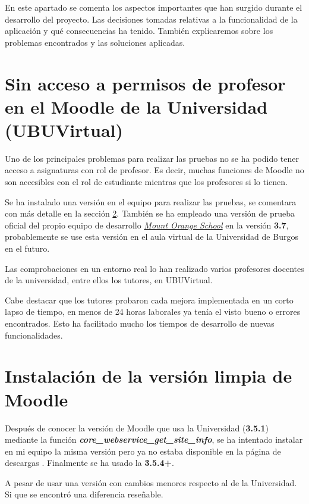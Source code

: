 
En este apartado se comenta los aspectos importantes que han surgido durante el desarrollo del proyecto. Las decisiones tomadas relativas a la funcionalidad de la aplicación y qué consecuencias ha tenido. También explicaremos sobre los problemas encontrados y las soluciones aplicadas.

\section{Sin acceso a permisos de profesor en el Moodle de la Universidad (UBUVirtual)}

Uno de los principales problemas para realizar las pruebas no se ha podido tener acceso a asignaturas con rol de profesor. Es decir, muchas funciones de Moodle no son accesibles con el rol de estudiante mientras que los profesores si lo tienen.


Se ha instalado una versión en el equipo para realizar las pruebas, se comentara con más detalle en la sección \ref{sec:instalacionMoodle}. También se ha empleado una versión de prueba oficial del propio equipo de desarrollo \href{https://school.demo.moodle.net}{\textit{Mount Orange School}} en la versión \textbf{3.7}, probablemente se use esta versión en el aula virtual de la Universidad de Burgos en el futuro.

Las comprobaciones en un entorno real lo han realizado varios profesores docentes de la universidad, entre ellos los tutores, en UBUVirtual. 

Cabe destacar que los tutores probaron cada mejora implementada en un corto lapso de tiempo, en menos de 24 horas laborales ya tenía el visto bueno o errores encontrados. Esto ha facilitado mucho los tiempos de desarrollo de nuevas funcionalidades.

\section{Instalación de la versión limpia de Moodle} \label{sec:instalacionMoodle}
Después de conocer la versión de Moodle que usa la Universidad (\textbf{3.5.1}) mediante  la función \textbf{\textit{core\_webservice\_get\_site\_info}}, se ha intentado instalar en mi equipo la misma versión pero ya no estaba disponible en la página de descargas \cite{noauthor_moodle_nodate}. Finalmente se ha usado la \textbf{3.5.4+}.

A pesar de usar una versión con cambios menores respecto al de la Universidad. Si que se encontró una diferencia reseñable. 

